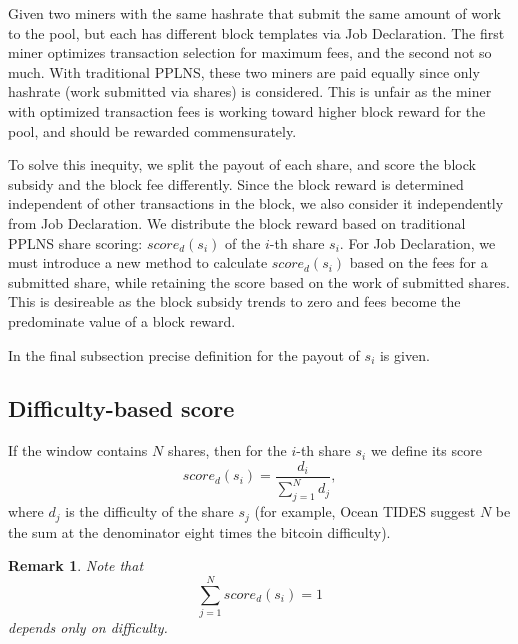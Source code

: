 \documentclass[11pt]{article}
\newtheorem{remark}{Remark}[subsection]
\begin{document}
Given two miners with the same hashrate that submit the same amount of work to the pool, but each has different block templates via Job Declaration. The first miner optimizes transaction selection for maximum fees, and the second not so much. With traditional PPLNS, these two miners are paid equally since only hashrate (work submitted via shares) is considered. This is unfair as the miner with optimized transaction fees is working toward higher block reward for the pool, and should be rewarded commensurately.

To solve this inequity, we split the payout of each share, and score the block subsidy and the block fee differently. Since the block reward is determined independent of other transactions in the block, we also consider it independently from Job Declaration. We distribute the block reward based on traditional PPLNS share scoring: $score_d(s_i)$ of the $i$-th share $s_i$.\newline
For Job Declaration, we must introduce a new method to calculate $score_d(s_i)$ based on the fees for a submitted share, while retaining the score based on the work of submitted shares. This is desireable as the block subsidy trends to zero and fees become the predominate value of a block reward. 

In the final subsection precise definition for the payout of $s_i$ is given.

\subsection{Difficulty-based score}
If the window contains $N$ shares, then for the $i$-th share $s_i$ we define its score
\[score_d(s_i) = \frac{d_i}{\sum_{j=1}^Nd_j},\]
where $d_j$ is the difficulty of the share $s_j$ (for example, Ocean TIDES\cite{ocean} suggest $N$ be the sum at the denominator eight times the bitcoin difficulty).\newline
\begin{remark}
	Note that \[\sum_{j=1}^N score_d(s_i) = 1\] depends only on difficulty.
\end{remark}
\end{document}
